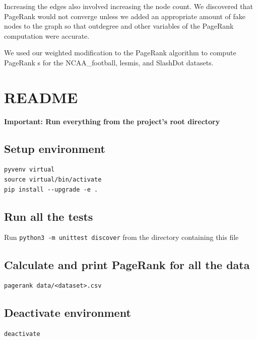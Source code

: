 \documentclass[draft]{report}
\newcommand{\pagerank}{PageRank }
\begin{document}
Increasing the edges also involved increasing the node count. We discovered that
\pagerank would not converge unless we added an appropriate amount of fake nodes
to the graph so that outdegree and other variables of the \pagerank computation
were accurate.

We used our weighted modification to the \pagerank algorithm to compute \pagerank s
for the NCAA\_football, lesmis, and SlashDot datasets.


\appendix

\section{README}
\lstset{language=bash}
\textbf{Important: Run everything from the project's root directory}

\subsection{Setup environment}
\begin{lstlisting}
pyvenv virtual
source virtual/bin/activate
pip install --upgrade -e .
\end{lstlisting}

\subsection{Run all the tests}
Run \verb+python3 -m unittest discover+ from the directory containing
this file

\subsection{Calculate and print \pagerank for all the data}
\begin{lstlisting}
pagerank data/<dataset>.csv
\end{lstlisting}

\subsection{Deactivate environment}
\begin{lstlisting}
deactivate
\end{lstlisting}
\end{document}
